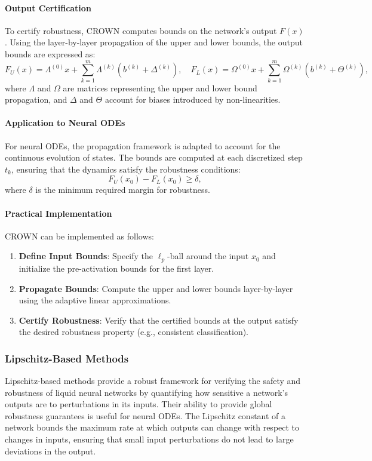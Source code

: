 \paragraph{Output Certification}
To certify robustness, CROWN computes bounds on the network's output \(F(x)\). Using the layer-by-layer propagation of the upper and lower bounds, the output bounds are expressed as:
\[
F_U(x) = \Lambda^{(0)} x + \sum_{k=1}^m \Lambda^{(k)} (b^{(k)} + \Delta^{(k)}), \quad
F_L(x) = \Omega^{(0)} x + \sum_{k=1}^m \Omega^{(k)} (b^{(k)} + \Theta^{(k)}),
\]
where \(\Lambda\) and \(\Omega\) are matrices representing the upper and lower bound propagation, and \(\Delta\) and \(\Theta\) account for biases introduced by non-linearities.

\paragraph{Application to Neural ODEs}
For neural ODEs, the propagation framework is adapted to account for the continuous evolution of states. The bounds are computed at each discretized step \(t_k\), ensuring that the dynamics satisfy the robustness conditions:
\[
F_U(x_0) - F_L(x_0) \geq \delta,
\]
where \(\delta\) is the minimum required margin for robustness.

\paragraph{Practical Implementation}
CROWN can be implemented as follows:
\begin{enumerate}
    \item \textbf{Define Input Bounds}: Specify the \(\ell_p\)-ball around the input \(x_0\) and initialize the pre-activation bounds for the first layer.
    \item \textbf{Propagate Bounds}: Compute the upper and lower bounds layer-by-layer using the adaptive linear approximations.
    \item \textbf{Certify Robustness}: Verify that the certified bounds at the output satisfy the desired robustness property (e.g., consistent classification).
\end{enumerate}

\subsubsection*{Lipschitz-Based Methods}

Lipschitz-based methods provide a robust framework for verifying the safety and robustness of liquid neural networks by quantifying how sensitive a network's outputs are to perturbations in its inputs. Their ability to provide global robustness guarantees is useful for neural ODEs. The Lipschitz constant of a network bounds the maximum rate at which outputs can change with respect to changes in inputs, ensuring that small input perturbations do not lead to large deviations in the output.

